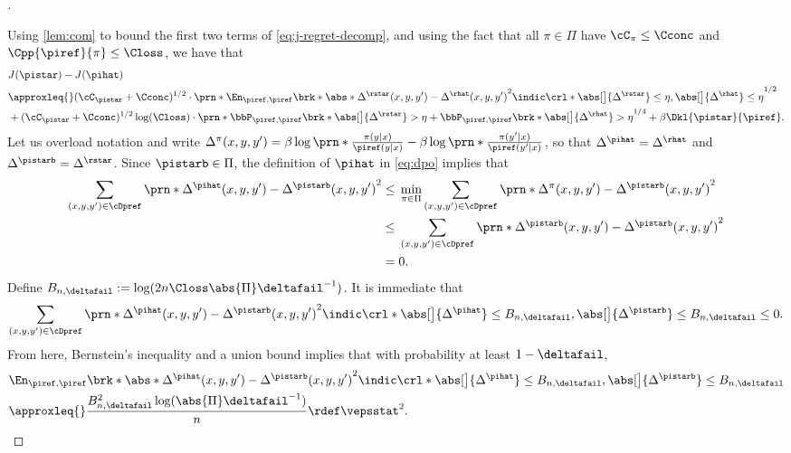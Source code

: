 \begin{proof}[]
\begin{lemma}
\end{lemma}
Using \cref{lem:com} to bound the first two terms of \cref{eq:j-regret-decomp}, and using the fact that all $\pi\in\Pi$ have
$\cC_{\pi}\leq\Cconc$ and $\Cpp{\piref}{\pi}\leq\Closs$, we
have that
\begin{align}
&J(\pistar) - J(\pihat) \\
&\approxleq{} (\cC_{\pistar}+\Cconc)^{1/2}\cdot\prn*{\En_{\piref,\piref}\brk*{\abs*{\Delta^{\rstar}(x,y,y') -
    \Delta^{\rhat}(x,y,y')}^2\indic\crl*{\abs[\big]{\Delta^{\rstar}}\leq\eta,
\abs[\big]{\Delta^{\rhat}}\leq\eta}}}^{1/2}\\
&+(\cC_{\pistar}+\Cconc)^{1/2}\log(\Closs)\cdot\prn*{\bbP_{\piref,\piref}\brk*{\abs[\big]{\Delta^{\rstar}}>\eta}
+
\bbP_{\piref,\piref}\brk*{\abs[\big]{\Delta^{\rhat}}>\eta}}^{1/4}
+
\beta\Dkl{\pistar}{\piref}.
\label{eq:dpo1}
\end{align}
Let us overload notation and write $\Delta^{\pi}(x,y,y') =
\beta\log\prn*{\frac{\pi(y\mid{}x)}{\piref(y\mid{}x)}}-\beta\log\prn*{\frac{\pi(y'\mid{}x)}{\piref(y'\mid{}x)}}$,
so that $\Delta^{\pihat}=\Delta^{\rhat}$ and
$\Delta^{\pistarb}=\Delta^{\rstar}$. Since $\pistarb\in\Pi$, the
definition of $\pihat$ in \cref{eq:dpo} implies that
\begin{align}
  \sum_{(x,y,y')\in\cDpref}\prn*{\Delta^{\pihat}(x,y,y')-\Delta^{\pistarb}(x,y,y')
  }^2
  &\leq{}
  \min_{\pi\in\Pi}\sum_{(x,y,y')\in\cDpref}\prn*{\Delta^{\pi}(x,y,y')-\Delta^{\pistarb}(x,y,y')}^2\\
  &\leq{}
  \sum_{(x,y,y')\in\cDpref}\prn*{\Delta^{\pistarb}(x,y,y')-\Delta^{\pistarb}(x,y,y')}^2 \\
  &= 0. \label{eq:emp_loss}
\end{align}
\newcommand{\Brange}{B_{n,\deltafail}}
Define $\Brange := \log(2n\Closs\abs{\Pi}\deltafail^{-1})$. It is immediate that
\begin{align}
    \sum_{(x,y,y')\in\cDpref}\prn*{\Delta^{\pihat}(x,y,y')-\Delta^{\pistarb}(x,y,y')
  }^2 \indic\crl*{\abs[\big]{\Delta^{\pihat}}\leq\Brange,
  \abs[\big]{\Delta^{\pistarb}}\leq\Brange}
  \leq{} 0.
\end{align}
From here, Bernstein's inequality and a union bound implies that with probability at least $1-\deltafail$,
\begin{align}
&\En_{\piref,\piref}\brk*{\abs*{\Delta^{\pihat}(x,y,y') -
\Delta^{\pistarb}(x,y,y')}^2\indic\crl*{\abs[\big]{\Delta^{\pihat}}\leq\Brange,
\abs[\big]{\Delta^{\pistarb}}\leq\Brange}} \\
&\approxleq{} \frac{\Brange^2\log(\abs{\Pi}\deltafail^{-1})}{n}\rdef\vepsstat^2.

\end{align}
\end{proof}

